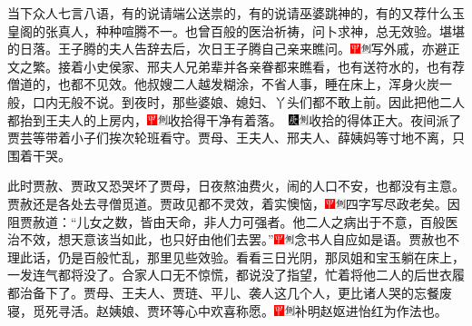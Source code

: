 当下众人七言八语，有的说请端公送祟的，有的说请巫婆跳神的，有的又荐什么玉皇阁的张真人，种种喧腾不一。也曾百般的医治祈祷，问卜求神，总无效验。堪堪的日落。王子腾的夫人告辞去后，次日王子腾自己亲来瞧问。{\includegraphics[width=3mm]{../Images/00002}\includegraphics[width=3mm]{../Images/00011}\footnotesize \kaishu 写外戚，亦避正文之繁。}接着小史侯家、邢夫人兄弟辈并各亲眷都来瞧看，也有送符水的，也有荐僧道的，也都不见效。他叔嫂二人越发糊涂，不省人事，睡在床上，浑身火炭一般，口内无般不说。到夜时，那些婆娘、媳妇、丫头们都不敢上前。因此把他二人都抬到王夫人的上房内，{\includegraphics[width=3mm]{../Images/00002}\includegraphics[width=3mm]{../Images/00011}\footnotesize \kaishu 收拾得干净有着落。　\includegraphics[width=3mm]{../Images/00004}\includegraphics[width=3mm]{../Images/00011}\footnotesize \kaishu 收拾的得体正大。}夜间派了贾芸等带着小子们挨次轮班看守。贾母、王夫人、邢夫人、薛姨妈等寸地不离，只围着干哭。

此时贾赦、贾政又恐哭坏了贾母，日夜熬油费火，闹的人口不安，也都没有主意。贾赦还是各处去寻僧觅道。贾政见都不灵效，着实懊恼，{\includegraphics[width=3mm]{../Images/00002}\includegraphics[width=3mm]{../Images/00011}\footnotesize \kaishu 四字写尽政老矣。}因阻贾赦道：“儿女之数，皆由天命，非人力可强者。他二人之病出于不意，百般医治不效，想天意该当如此，也只好由他们去罢。”{\includegraphics[width=3mm]{../Images/00002}\includegraphics[width=3mm]{../Images/00011}\footnotesize \kaishu 念书人自应如是语。}贾赦也不理此话，仍是百般忙乱，那里见些效验。看看三日光阴，那凤姐和宝玉躺在床上，一发连气都将没了。合家人口无不惊慌，都说没了指望，忙着将他二人的后世衣履都治备下了。贾母、王夫人、贾琏、平儿、袭人这几个人，更比诸人哭的忘餐废寝，觅死寻活。赵姨娘、贾环等心中欢喜称愿。{\includegraphics[width=3mm]{../Images/00002}\includegraphics[width=3mm]{../Images/00011}\footnotesize \kaishu 补明赵妪进怡红为作法也。}

